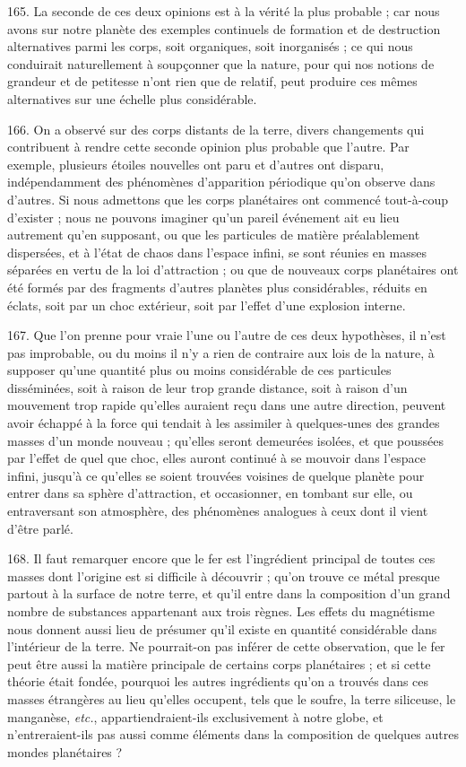 \documentclass[a4paper, 11pt, oneside, polutonikogreek, french]{article}
\begin{document}
165. La seconde de ces deux opinions est à la vérité la plus probable ; car nous avons sur notre planète des exemples continuels de formation et de destruction alternatives parmi les corps, soit organiques, soit inorganisés ; ce qui nous conduirait naturellement à soupçonner que la nature, pour qui nos notions de grandeur et de petitesse n'ont rien que de relatif, peut produire ces mêmes alternatives sur une échelle plus considérable.

166. On a observé sur des corps distants de la terre, divers changements qui contribuent à rendre cette seconde opinion plus probable que l'autre. Par exemple, plusieurs étoiles nouvelles ont paru et d'autres ont disparu, indépendamment des phénomènes d'apparition périodique qu'on observe dans d'autres. Si nous admettons que les corps planétaires ont commencé tout-à-coup d'exister ; nous ne pouvons imaginer qu'un pareil événement ait eu lieu autrement qu'en supposant, ou que les particules de matière préalablement dispersées, et à l'état de chaos dans l'espace infini, se sont réunies en masses séparées en vertu de la loi d'attraction ; ou que de nouveaux corps planétaires ont été formés par des fragments d'autres planètes plus considérables, réduits en éclats, soit par un choc extérieur, soit par l'effet d'une explosion interne.

167. Que l'on prenne pour vraie l'une ou l'autre de ces deux hypothèses, il n'est pas improbable, ou du moins il n'y a rien de contraire aux lois de la nature, à supposer qu'une quantité plus ou moins considérable de ces particules disséminées, soit à raison de leur trop grande distance, soit à raison d'un mouvement trop rapide qu'elles auraient reçu dans une autre direction, peuvent avoir échappé à la force qui tendait à les assimiler à quelques-unes des grandes masses d'un monde nouveau ; qu'elles seront demeurées isolées, et que poussées par l'effet de quel que choc, elles auront continué à se mouvoir dans l'espace infini, jusqu'à ce qu'elles se soient trouvées voisines de quelque planète pour entrer dans sa sphère d'attraction, et occasionner, en tombant sur elle, ou entraversant son atmosphère, des phénomènes analogues à ceux dont il vient d'être parlé.

168. Il faut remarquer encore que le fer est l'ingrédient principal de toutes ces masses dont l'origine est si difficile à découvrir ; qu'on trouve ce métal presque partout à la surface de notre terre, et qu'il entre dans la composition d'un grand nombre de substances appartenant aux trois règnes. Les effets du magnétisme nous donnent aussi lieu de présumer qu'il existe en quantité considérable dans l'intérieur de la terre. Ne pourrait-on pas inférer de cette observation, que le fer peut être aussi la matière principale de certains corps planétaires ; et si cette théorie était fondée, pourquoi les autres ingrédients qu'on a trouvés dans ces masses étrangères au lieu qu'elles occupent, tels que le soufre, la terre siliceuse, le manganèse, \emph{etc.}, appartiendraient-ils exclusivement à notre globe, et n'entreraient-ils pas aussi comme éléments dans la composition de quelques autres mondes planétaires ? \fg
\end{document}
